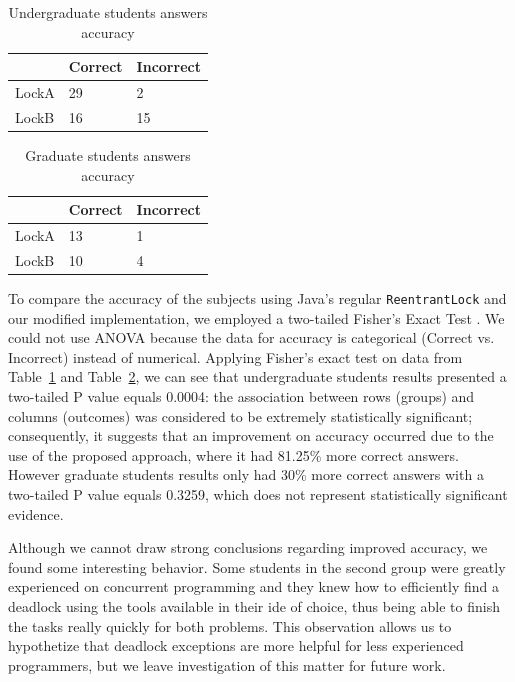 \begin{table}
\begin{center}
\caption{Undergraduate students answers accuracy}\label{tab:acc1}
\begin{tabular}{|l|l|l|}
\hline
 & Correct & Incorrect\\
\hline
LockA & 29 & 2\\
LockB & 16 & 15\\
\hline
\end{tabular}
\end{center}
\end{table}

\begin{table}
\begin{center}
\caption{Graduate students answers accuracy}\label{tab:acc2}
\begin{tabular}{|l|l|l|}
\hline
 & Correct & Incorrect\\
\hline
LockA & 13 & 1\\
LockB & 10 & 4\\
\hline
\end{tabular}
\end{center}
\end{table}

To compare the accuracy of the subjects using Java's regular {\tt ReentrantLock} and our modified implementation, we employed a two-tailed Fisher's Exact Test \cite{agresti}. We could not use ANOVA because the data for accuracy is categorical (Correct vs. Incorrect) instead of numerical. 
Applying Fisher's exact test on data from Table~\ref{tab:acc1} and Table~\ref{tab:acc2}, we can see that undergraduate students results presented a two-tailed P value equals 0.0004: the association between rows (groups) and columns (outcomes) was considered to be extremely statistically significant; consequently, it suggests that an improvement on accuracy occurred due to the use of the proposed approach, where it had 81.25\% more correct answers. However graduate students results only had 30\% more correct answers with a two-tailed P value equals 0.3259, which does not represent statistically significant evidence.

Although we cannot draw strong conclusions regarding improved accuracy, we found some interesting behavior. Some students in the second group were greatly experienced on concurrent programming and they knew how to efficiently find a deadlock using the tools available in their \ac{ide} of choice, thus being able to finish the tasks really quickly for both problems. This observation allows us to hypothetize that deadlock exceptions are more helpful for less experienced programmers, but we leave investigation of this matter for future work.

